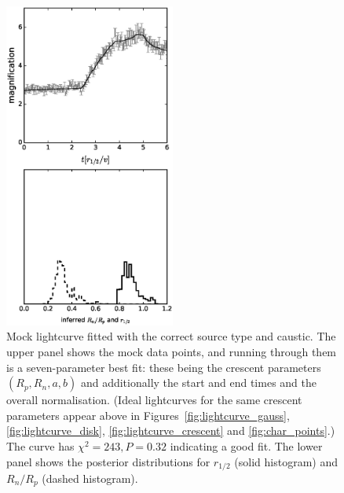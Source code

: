 \documentclass[usenatbib]{mn2e}
\begin{document}
\begin{figure}
  \includegraphics[width=0.5\textwidth]{figures/cc_forward.eps}
\caption{\label{fig:cc_forward} Mock lightcurve fitted with the
  correct source type and caustic.  The upper panel shows the mock
  data points, and running through them is a seven-parameter best fit:
  these being the crescent parameters $(R_p,R_n,a,b)$ and additionally
  the start and end times and the overall normalisation.  (Ideal
  lightcurves for the same crescent parameters appear above in
  Figures~\ref{fig:lightcurve_gauss}, \ref{fig:lightcurve_disk},
  \ref{fig:lightcurve_crescent} and \ref{fig:char_points}.)  The curve
  has $\chi^2=243, P=0.32$ indicating a good fit.  The lower panel
  shows the posterior distributions for $r_{1/2}$ (solid histogram)
  and $R_n/R_p$ (dashed histogram).}
\end{figure}
\end{document}
